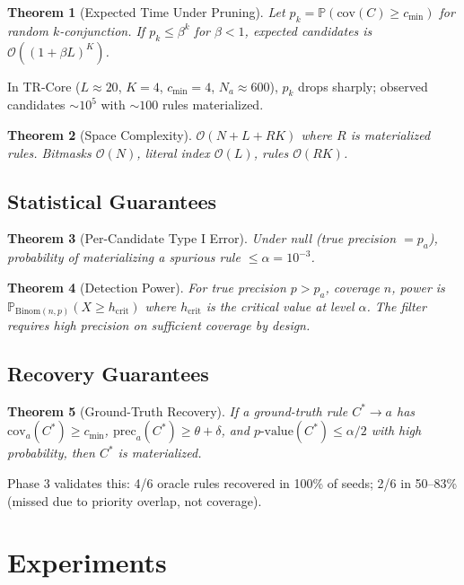 \documentclass[11pt]{article}
\newcommand{\Prob}{\mathbb{P}}
\newcommand{\Binom}{\mathrm{Binom}}
\newcommand{\Oh}{\mathcal{O}}
\newtheorem{theorem}{Theorem}
\begin{document}
\begin{theorem}[Expected Time Under Pruning]
Let $p_k = \Prob(\mathrm{cov}(C) \geq c_{\min})$ for random $k$-conjunction. If $p_k \leq \beta^k$ for $\beta < 1$, expected candidates is $\Oh((1+\beta L)^K)$.
\end{theorem}

In TR-Core ($L \approx 20$, $K=4$, $c_{\min}=4$, $N_a \approx 600$), $p_k$ drops sharply; observed candidates $\sim 10^5$ with $\sim 100$ rules materialized.

\begin{theorem}[Space Complexity]
$\Oh(N + L + R K)$ where $R$ is materialized rules. Bitmasks $\Oh(N)$, literal index $\Oh(L)$, rules $\Oh(R K)$.
\end{theorem}

\subsection{Statistical Guarantees}

\begin{theorem}[Per-Candidate Type I Error]
Under null (true precision $= p_a$), probability of materializing a spurious rule $\leq \alpha = 10^{-3}$.
\end{theorem}

\begin{theorem}[Detection Power]
For true precision $p > p_a$, coverage $n$, power is $\Prob_{\Binom(n, p)}(X \geq h_{\text{crit}})$ where $h_{\text{crit}}$ is the critical value at level $\alpha$. The filter requires high precision on sufficient coverage by design.
\end{theorem}

\subsection{Recovery Guarantees}
\begin{theorem}[Ground-Truth Recovery]
If a ground-truth rule $C^* \to a$ has $\mathrm{cov}_a(C^*) \geq c_{\min}$, $\mathrm{prec}_a(C^*) \geq \theta + \delta$, and $p\text{-value}(C^*) \leq \alpha/2$ with high probability, then $C^*$ is materialized.
\end{theorem}

Phase 3 validates this: 4/6 oracle rules recovered in 100\% of seeds; 2/6 in 50--83\% (missed due to priority overlap, not coverage).

\section{Experiments}
\label{sec:experiments}
\end{document}
